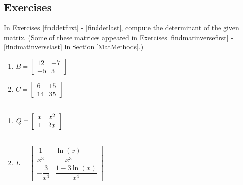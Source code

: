 \newpage

\subsection{Exercises}

In Exercises \ref{finddetfirst} - \ref{finddetlast},  compute the determinant of the given matrix.  (Some of these matrices appeared in Exercises \ref{findmatinversefirst} - \ref{findmatinverselast} in Section \ref{MatMethods}.)

\begin{multicols}{2}
\begin{enumerate}

\item $B = \left[ \begin{array}{rr} 12 & -7 \\ -5 & 3 \end{array} \right]$ \label{finddetfirst}
\item $C = \left[ \begin{array}{rr} 6 & 15 \\ 14 & 35 \end{array} \right]$ \label{matrixC}

\setcounter{HW}{\value{enumi}}
\end{enumerate}
\end{multicols}

\begin{multicols}{2}
\begin{enumerate}
\setcounter{enumi}{\value{HW}}

\item $Q = \left[ \begin{array}{rr} x & x^{2} \\ 1 & 2x \end{array} \right] \vphantom{ \left[ \begin{array}{rr} \dfrac{1}{x^{3}} & \dfrac{\ln(x)}{x^{3}} \\[10pt] -\dfrac{3}{x^{4}} & \dfrac{1 - 3\ln(x)}{x^{4}} \end{array} \right]}$
\item $L = \left[ \begin{array}{rr} \dfrac{1}{x^{3}} & \dfrac{\ln(x)}{x^{3}} \\[10pt] -\dfrac{3}{x^{4}} & \dfrac{1 - 3\ln(x)}{x^{4}} \end{array} \right]$


\setcounter{HW}{\value{enumi}}
\end{enumerate}
\end{multicols}


